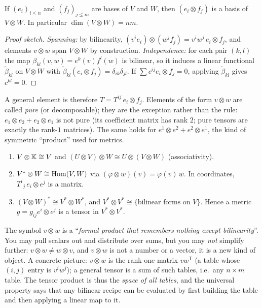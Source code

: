 \begin{theorem}\label{thm:tensorbasis}
If $(e_i)_{i\le n}$ and $(f_j)_{j\le m}$ are bases of $V$ and $W$, then $(e_i\otimes f_j)$ is a basis of $V\otimes W$.
In particular $\dim(V\otimes W)=nm$.
\end{theorem}
\begin{proof}[Proof sketch]
\emph{Spanning:} by bilinearity, $(v^ie_i)\otimes(w^jf_j)=v^iw^j\,e_i\otimes f_j$, and elements $v\otimes w$ span $V\otimes W$ by construction.
\emph{Independence:} for each pair $(k,l)$ the map $\beta_{kl}(v,w)=e^k(v)f^l(w)$ is bilinear, so it induces a linear
functional $\tilde\beta_{kl}$ on $V\otimes W$ with $\tilde\beta_{kl}(e_i\otimes f_j)=\delta_{ik}\delta_{jl}$. If $\sum c^{ij}e_i\otimes f_j=0$,
applying $\tilde\beta_{kl}$ gives $c^{kl}=0$.
\end{proof}

A general element is therefore $T=T^{ij}\,e_i\otimes f_j$. Elements of the form $v\otimes w$ are called
\emph{pure} (or decomposable); they are the exception rather than the rule: $e_1\otimes e_2+e_2\otimes e_1$ is not pure
(its coefficient matrix has rank $2$; pure tensors are exactly the rank-$1$ matrices). The same holds for
$e^{1}\otimes e^{2}+e^{2}\otimes e^{1}$, the kind of symmetric ``product'' used for metrics.

\begin{proposition}
\begin{enumerate}
  \item $V\otimes\mathbb{K}\cong V$ and $(U\otimes V)\otimes W\cong U\otimes(V\otimes W)$ (associativity).
  \item $V^*\otimes W\cong\mathrm{Hom}(V,W)$ via $(\varphi\otimes w)(v)=\varphi(v)\,w$. In coordinates, $T^{i}{}_{j}\,e_i\otimes e^j$ is a matrix.
  \item $(V\otimes W)^*\cong V^*\otimes W^*$, and $V^*\otimes V^*\cong\{\text{bilinear forms on }V\}$. Hence a metric $g=g_{ij}e^i\otimes e^j$ is a tensor in $V^*\otimes V^*$.
\end{enumerate}
\end{proposition}

\begin{intuition}
The symbol $v\otimes w$ is a ``\emph{formal product that remembers nothing except bilinearity}''. You may
pull scalars out and distribute over sums, but you may \emph{not} simplify further: $v\otimes w\neq w\otimes v$,
and $v\otimes w$ is not a number or a vector, it is a new kind of object.
A concrete picture: $v\otimes w$ is the rank-one matrix $vw^{\mathsf T}$ (a table whose $(i,j)$ entry is $v^iw^j$);
a general tensor is a sum of such tables, i.e.\ any $n\times m$ table. The tensor product is thus the
\emph{space of all tables}, and the universal property says that any bilinear recipe can be evaluated by first
building the table and then applying a linear map to it.
\end{intuition}
